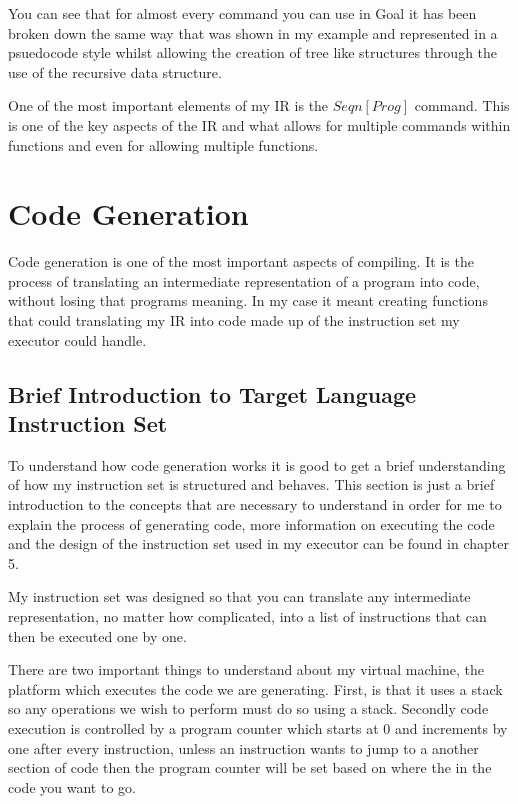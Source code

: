 You can see that for almost every command you can use in Goal it has been broken down the same way that was shown in my example and represented in a psuedocode style whilst allowing the creation of tree like structures through the use of the recursive data structure.

One of the most important elements of my IR is the $Seqn [Prog]$ command. This is one of the key aspects of the IR and what allows for multiple commands within functions and even for allowing multiple functions.


\section{Code Generation}

Code generation is one of the most important aspects of compiling. It is the process of translating an intermediate representation of a program into code, without losing that programs meaning. In my case it meant creating functions that could translating my IR into code made up of the instruction set my executor could handle.  


\subsection{Brief Introduction to Target Language Instruction Set}

To understand how code generation works it is good to get a brief understanding of how my instruction set is structured and behaves. This section is just a brief introduction to the concepts that are necessary to understand in order for me to explain the process of generating code, more information on executing the code and the design of the instruction set used in my executor can be found in chapter 5.

My instruction set was designed so that you can translate any intermediate representation, no matter how complicated, into a list of instructions that can then be executed one by one. 

There are two important things to understand about my virtual machine, the platform which executes the code we are generating. First, is that it uses a stack so any operations we wish to perform must do so using a stack. Secondly code execution is controlled by a program counter which starts at 0 and increments by one after every instruction, unless an instruction wants to jump to a another section of code then the program counter will be set based on where the in the code you want to go. 

